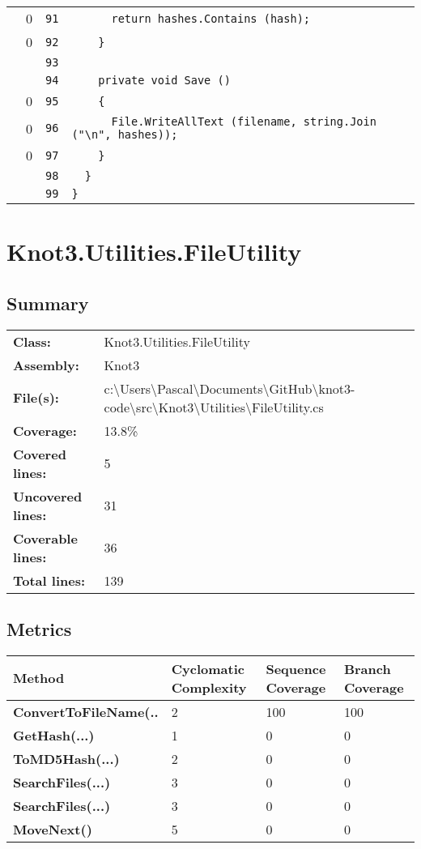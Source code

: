 \documentclass[a4paper,10pt]{article}
\begin{document}
\begin{longtable}[l]{lrrl}
\cellcolor{red} & 0 & \verb~91~ & \verb~      return hashes.Contains (hash);~\\
\cellcolor{red} & 0 & \verb~92~ & \verb~    }~\\
\cellcolor{gray} &  & \verb~93~ & \verb~~\\
\cellcolor{gray} &  & \verb~94~ & \verb~    private void Save ()~\\
\cellcolor{red} & 0 & \verb~95~ & \verb~    {~\\
\cellcolor{red} & 0 & \verb~96~ & \verb~      File.WriteAllText (filename, string.Join ("\n", hashes));~\\
\cellcolor{red} & 0 & \verb~97~ & \verb~    }~\\
\cellcolor{gray} &  & \verb~98~ & \verb~  }~\\
\cellcolor{gray} &  & \verb~99~ & \verb~}~\\
\end{longtable}
\newpage
\section{Knot3.Utilities.FileUtility}
\subsection{Summary}
\begin{longtable}[l]{ll}
\textbf{Class:} & Knot3.Utilities.FileUtility\\
\textbf{Assembly:} & Knot3\\
\textbf{File(s):} & \begin{minipage}[t]{12cm}{c:\textbackslash Users\textbackslash Pascal\textbackslash Documents\textbackslash GitHub\textbackslash knot3-code\textbackslash src\textbackslash Knot3\textbackslash Utilities\textbackslash FileUtility.cs}\end{minipage} \\
\textbf{Coverage:} & 13.8\%\\
\textbf{Covered lines:} & 5\\
\textbf{Uncovered lines:} & 31\\
\textbf{Coverable lines:} & 36\\
\textbf{Total lines:} & 139\\
\end{longtable}
\subsection{Metrics}
\begin{longtable}[l]{|l|l|l|l|}
\hline
\textbf{Method} & \textbf{Cyclomatic Complexity} & \textbf{Sequence Coverage} & \textbf{Branch Coverage}\\
\hline
\textbf{ConvertToFileName(..} & 2 & 100 & 100\\
\hline
\textbf{GetHash(...)} & 1 & 0 & 0\\
\hline
\textbf{ToMD5Hash(...)} & 2 & 0 & 0\\
\hline
\textbf{SearchFiles(...)} & 3 & 0 & 0\\
\hline
\textbf{SearchFiles(...)} & 3 & 0 & 0\\
\hline
\textbf{MoveNext()} & 5 & 0 & 0\\
\hline
\end{longtable}
\end{document}
